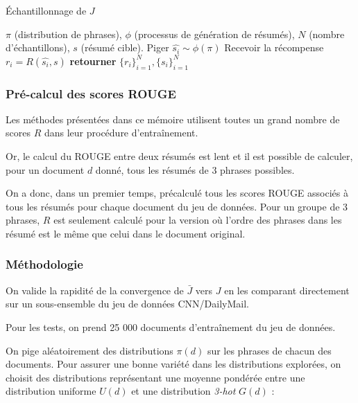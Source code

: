 \begin{algorithm}
    \caption{Échantillonnage de $J$}
    \begin{algorithmic}[1]
        \Require $\pi$ (distribution de phrases), $\phi$ (processus de génération de résumés), $N$ (nombre d'échantillons), $s$ (résumé cible).
        \State Piger $\hat{s_i}\sim \phi\left(\pi\right)$
        \State Recevoir la récompense $r_i = R(\hat{s_i}, s)$
        \EndFor
        \State \textbf{retourner}  $\{r_i\}_{i=1}^N, \{s_i\}_{i=1}^N$
        \EndProcedure
    \end{algorithmic}
    \label{alg:approx_J}
\end{algorithm}

\subsubsection*{Pré-calcul des scores ROUGE}

Les méthodes présentées dans ce mémoire utilisent toutes
un grand nombre de scores $R$ dans leur procédure d'entraînement.

Or, le calcul du ROUGE entre deux résumés est lent et il est possible de calculer,
pour un document $d$ donné, tous les résumés de 3 phrases possibles.

On a donc, dans un premier temps, précalculé tous les scores ROUGE
associés à tous les résumés pour chaque document du jeu de données.
Pour un groupe de 3 phrases, $R$ est seulement calculé pour la version
où l'ordre des phrases dans les résumé est le même que celui dans le document original.

\subsubsection*{Méthodologie}

On valide la rapidité de la convergence de $\bar{J}$ vers $J$ en les comparant
directement sur un sous-ensemble du jeu de données CNN/DailyMail.

Pour les tests, on prend 25 000 documents d'entraînement du jeu de données.

On pige aléatoirement des distributions $\pi(d)$ sur les phrases de chacun des documents.
Pour assurer une bonne variété dans les distributions explorées, on choisit des
distributions représentant une moyenne pondérée entre une distribution uniforme
$U(d)$ et une distribution \textit{3-hot} $G(d)$ :


